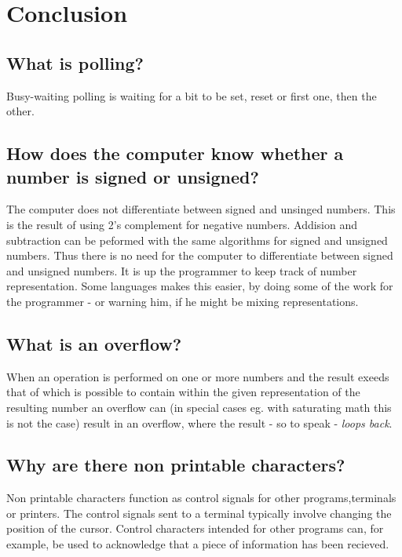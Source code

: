 \section{Conclusion}

\subsection{What is polling?}
Busy-waiting polling is waiting for a bit to be set, reset or first one, then
the other.

\subsection{How does the computer know whether a number is signed or unsigned?}
The computer does not differentiate between signed and unsinged numbers. This is
the result of using 2's complement for negative numbers. Addision and
subtraction can be peformed with the same algorithms for signed and unsigned
numbers. Thus there is no need for the computer to differentiate between signed
and unsigned numbers. It is up the programmer to keep track of number representation.
Some languages makes this easier, by doing some of the work for the programmer - or warning him, if he might be mixing representations.

\subsection{What is an overflow?}
When an operation is performed on one or more numbers and the result exeeds that
of which is possible to contain within the given representation of the resulting
number an overflow can (in special cases eg. with saturating math this is not
the case) result in an overflow, where the result - so to speak - \emph{loops
back}.

\subsection{Why are there non printable characters?}
Non printable characters function as control signals for other programs,terminals or printers.
The control signals sent to a terminal typically involve changing the position of the
cursor. Control characters intended for other programs can, for example, be used to 
acknowledge that a piece of information has been recieved.

